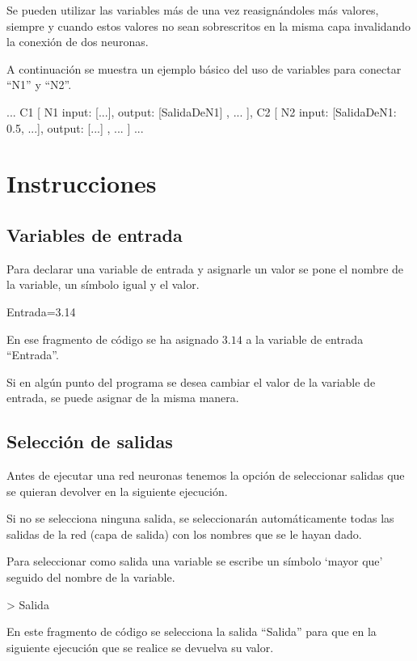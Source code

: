 \documentclass[a4paper]{article}
\begin{document}
Se pueden utilizar las variables más de una vez reasignándoles más valores, siempre y cuando estos valores no sean sobrescritos en la misma capa invalidando la conexión de dos neuronas.

A continuación se muestra un ejemplo básico del uso de variables para conectar ``N1'' y ``N2''.
\begin{codebox}
...
C1 [
	N1 { input: [...], output: [SalidaDeN1] },
	...
],
C2 [
	N2 { input: [SalidaDeN1: 0.5, ...], output: [...] },
	...
]
...
\end{codebox}

\section{Instrucciones}
\subsection{Variables de entrada}\label{entradas}
Para declarar una variable de entrada y asignarle un valor se pone el nombre de la variable, un símbolo igual y el valor.

\begin{codebox}
Entrada=3.14
\end{codebox}

En ese fragmento de código se ha asignado $3.14$ a la variable de entrada ``Entrada''.

Si en algún punto del programa se desea cambiar el valor de la variable de entrada, se puede asignar de la misma manera.

\subsection{Selección de salidas}

Antes de ejecutar una red neuronas tenemos la opción de seleccionar salidas que se quieran devolver en la siguiente ejecución.

Si no se selecciona ninguna salida, se seleccionarán automáticamente todas las salidas de la red (capa de salida) con los nombres que se le hayan dado.

Para seleccionar como salida una variable se escribe un símbolo `mayor que' seguido del nombre de la variable.

\begin{codebox}
> Salida
\end{codebox}

En este fragmento de código se selecciona la salida ``Salida'' para que en la siguiente ejecución que se realice se devuelva su valor.
\end{document}

